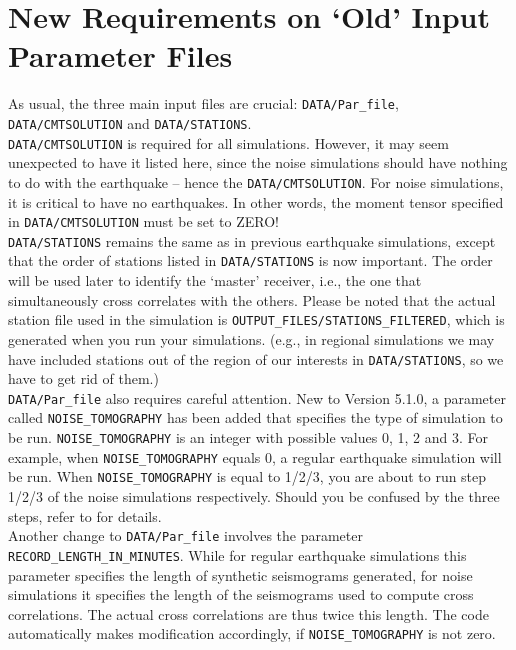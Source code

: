 \documentclass[oneside,english]{book}
\begin{document}
\section{New Requirements on `Old' Input Parameter Files}

As usual, the three main input files are crucial: \texttt{DATA/Par\_file}, \texttt{DATA/CMTSOLUTION} and
\texttt{DATA/STATIONS}.\\

\texttt{DATA/CMTSOLUTION} is required for all simulations. However, it may seem unexpected to have it listed here, since the
noise simulations should have nothing to do with the earthquake -- hence the \texttt{DATA/CMTSOLUTION}.
For noise simulations, it is critical to have no earthquakes. In other words, the moment tensor
specified in \texttt{DATA/CMTSOLUTION} must be set to ZERO! \\

\texttt{DATA/STATIONS} remains the same as in previous earthquake simulations,
except that the order of stations listed in \texttt{DATA/STATIONS} is now important.
The order will be used later to identify the `master' receiver,
i.e., the one that simultaneously cross correlates with the others.
Please be noted that the actual station file used in the simulation is \texttt{OUTPUT\_FILES/STATIONS\_FILTERED},
which is generated when you run your simulations. (e.g., in regional simulations we may have included stations out of the
region of our interests in \texttt{DATA/STATIONS}, so we have to get rid of them.)\\

\texttt{DATA/Par\_file} also requires careful attention.
New to Version 5.1.0, a parameter called \texttt{NOISE\_TOMOGRAPHY} has been added that specifies the type of simulation to be run.
\texttt{NOISE\_TOMOGRAPHY} is an integer with possible values 0, 1, 2 and 3.
For example, when \texttt{NOISE\_TOMOGRAPHY} equals 0, a regular earthquake simulation will be run.
When \texttt{NOISE\_TOMOGRAPHY} is equal to 1/2/3, you are about to run
step 1/2/3 of the noise simulations respectively.
Should you be confused by the three steps, refer to \citet{trompetal2010} for details.\\

Another change to \texttt{DATA/Par\_file} involves the parameter \texttt{RECORD\_LENGTH\_IN\_MINUTES}.
While for regular earthquake simulations this parameter specifies the length of synthetic seismograms generated,
for noise simulations it specifies the length of the seismograms used to compute cross correlations.
The actual cross correlations are thus twice this length.
The code automatically makes modification accordingly, if \texttt{NOISE\_TOMOGRAPHY} is not zero.\\
\end{document}
